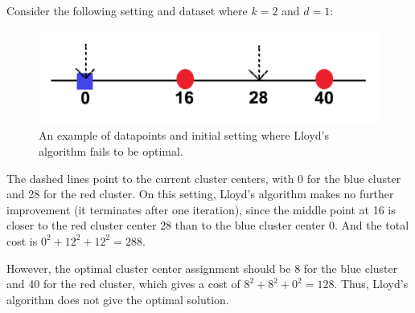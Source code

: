 \begin{example} Consider the following setting and dataset
where $k=2$ and $d=1$:
\begin{figure}
    \centering
    \captionsetup{width=0.8\textwidth}
    \includegraphics[scale=0.4]{chapter_1/files/kmeans.png}
    \caption{An example of datapoints and initial setting where
    Lloyd's algorithm fails to be optimal.}
    \label{fig:kmeans}
\end{figure}
The dashed lines point to the current cluster centers, with 0
for the blue cluster and 28 for the red cluster. On this
setting, Lloyd's algorithm makes no further improvement (it
terminates after one iteration), since the middle point at 16
is closer to the red cluster center 28 than to the blue cluster
center 0. And the total cost is $0^2+12^2+12^2=288$.

However, the optimal cluster center assignment should be 8 for
the blue cluster and 40 for the red cluster, which gives a cost
of $8^2+8^2+0^2=128$. Thus, Lloyd's algorithm does not give the
optimal solution.
\end{example}


